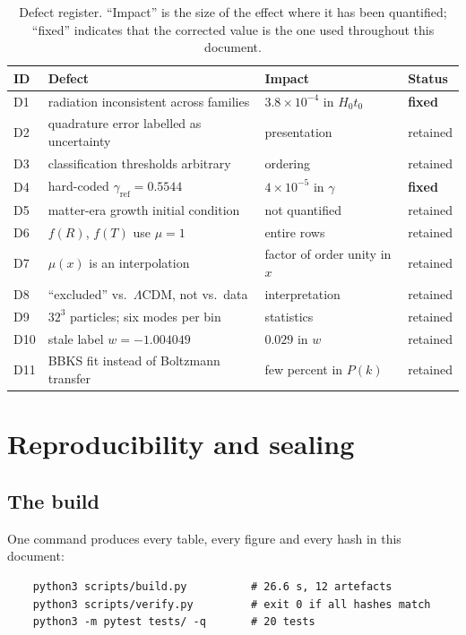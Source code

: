 \documentclass[11pt,a4paper]{article}
\theoremstyle{definition}
\newcommand{\Hzt}{H_0 t_0}
\newcommand{\gamm}{\gamma}
\begin{document}
\begin{table}[h]
\centering
\small
\caption{Defect register. ``Impact'' is the size of the effect where it has
been quantified; ``fixed'' indicates that the corrected value is the one used
throughout this document.}
\label{tab:defects}
\begin{tabular}{@{}llll@{}}
\toprule
ID & Defect & Impact & Status \\
\midrule
D1 & radiation inconsistent across families & $3.8\times10^{-4}$ in $\Hzt$ & \textbf{fixed} \\
D2 & quadrature error labelled as uncertainty & presentation & retained \\
D3 & classification thresholds arbitrary & ordering & retained \\
D4 & hard-coded $\gamm_{\mathrm{ref}} = 0.5544$ & $4\times10^{-5}$ in $\gamm$ & \textbf{fixed} \\
D5 & matter-era growth initial condition & not quantified & retained \\
D6 & $f(R)$, $f(T)$ use $\mu=1$ & entire rows & retained \\
D7 & $\mu(x)$ is an interpolation & factor of order unity in $x$ & retained \\
D8 & ``excluded'' vs.\ $\Lambda$CDM, not vs.\ data & interpretation & retained \\
D9 & $32^3$ particles; six modes per bin & statistics & retained \\
D10 & stale label $w = -1.004049$ & $0.029$ in $w$ & retained \\
D11 & BBKS fit instead of Boltzmann transfer & few percent in $P(k)$ & retained \\
\bottomrule
\end{tabular}
\end{table}

\section{Reproducibility and sealing}
\label{sec:repro}

\subsection{The build}

One command produces every table, every figure and every hash in this
document:
\begin{verbatim}
    python3 scripts/build.py          # 26.6 s, 12 artefacts
    python3 scripts/verify.py         # exit 0 if all hashes match
    python3 -m pytest tests/ -q       # 20 tests
\end{verbatim}
\end{document}
